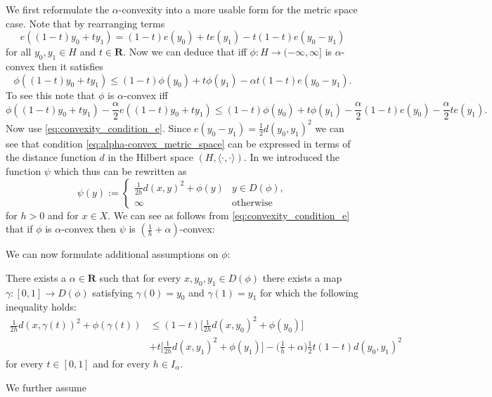 \documentclass[a4paper,11pt, leqno]{scrreprt} %
\makeatletter
\renewcommand{\leq}{\leqslant}
\renewcommand{\leq}{\leqslant}
\newcommand{\R}{\mathbf R}
\theoremstyle{change}
\theoremstyle{nonumberplain}
\newenvironment{optional}[1][Hypothesis]{
  \par\noindent \text{[#1]}
  \def\@currentlabel{[#1]}
}{\par\noindent\ignorespacesafterend}
\makeatother
\begin{document}
We first reformulate the $\alpha$-convexity into a more usable form
for the metric space case. Note that by rearranging terms
\begin{equation}
  \label{eq:convexity_condition_e}
  e((1 - t)y_0 + t y_1) = (1 - t)e(y_0) + t e(y_1) - t(1 - t)e(y_0 - y_1)
\end{equation}
for all $y_0, y_1 \in H$ and $t \in \R$. Now we can deduce that iff
$\phi: H \to (-\infty, \infty]$ is $\alpha$-convex then it satisfies
\begin{equation}
  \label{eq:rephrased_convexity_phi}
  \phi((1 - t)y_0 + t y_1) \leq (1 - t)\phi(y_0) + t\phi(y_1) - \alpha
  t(1 - t)e(y_0 - y_1).
\end{equation}
To see this note that $\phi$ is $\alpha$-convex iff
\begin{equation}
  \label{eq:alpha-convex_metric_space}
  \phi((1 - t)y_0 + t y_1) - \frac\alpha2 e((1 - t)y_0 + t y_1) \leq
  (1 - t)\phi(y_0) + t \phi(y_1) - \frac\alpha2 (1 - t) e(y_0) -
  \frac\alpha2 t e(y_1).
\end{equation}
Now use \eqref{eq:convexity_condition_e}. Since $e(y_0 - y_1) =
\frac12 d(y_0, y_1)^2$ we can see that condition
\eqref{eq:alpha-convex_metric_space} can be expressed in terms of the
distance function $d$ in the Hilbert space $(H, \langle \cdot, \cdot
\rangle)$. In  we introduced the function $\psi$
which thus can be rewritten as
\begin{equation}\label{eq:phi_metric_space}
\psi(y) :=
\begin{cases}
\frac{1}{2h} d(x,y)^2 + \phi(y) & y \in D(\phi),\\
\infty & \text{otherwise}
\end{cases}
\end{equation}
for $h > 0$ and for $x \in X$. We can see as follows from
\eqref{eq:convexity_condition_e} that if $\phi$ is $\alpha$-convex
then $\psi$ is $\left ( \frac1h + \alpha \right )$-convex: 

We can now formulate additional assumptions on $\phi$:
\begin{optional}[$H_1$]\label{hyp:ms_hypothesis_1}
There exists a $\alpha \in \R$ such that for every $x, y_0, y_1 \in
D(\phi)$ there exists a map $\gamma : [0,1] \to D(\phi)$ satisfying
$\gamma(0) = y_0$ and $\gamma(1) = y_1$ for which the following inequality holds:
\begin{equation}
  \label{eq:ms_hypothesis_1}
  \begin{split}
    \frac1{2h} d(x, \gamma(t))^2 + \phi(\gamma(t)) &\leq (1 - t) \Bigg
    [\frac{1}{2h} d(x, y_0)^2 + \phi(y_0) \Bigg ]\\
    &+ t \Bigg [ \frac1{2h} d(x, y_1)^2 + \phi(y_1) \Bigg ] - \Bigg
    (\frac1h + \alpha \Bigg ) \frac12 t(1 - t)d(y_0, y_1)^2
  \end{split}
\end{equation}
for every $t \in [0,1]$ and for every $h \in I_\alpha$.
\end{optional}
We further assume
\end{document}

